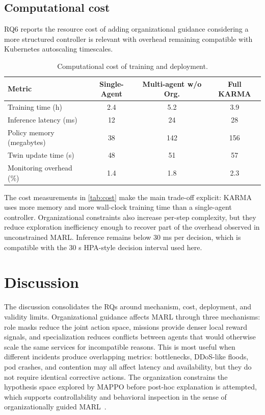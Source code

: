 \documentclass[journal]{IEEEtran}
\begin{document}
\subsection{Computational cost}

RQ6 reports the resource cost of adding organizational guidance considering a more structured controller is relevant with overhead remaining compatible with Kubernetes autoscaling timescales.
%
\begin{table}[t]
  \centering
  \caption{Computational cost of training and deployment.}
  \label{tab:cost}
  \scriptsize
  \setlength{\tabcolsep}{2.5pt}
  \begin{tabular}{lccc}
    \toprule
    \textbf{Metric}           & \textbf{Single-Agent} & \textbf{Multi-agent w/o Org.} & \textbf{Full KARMA} \\
    \midrule
    Training time (h)         & 2.4                   & 5.2                           & 3.9                 \\
    Inference latency (ms)    & 12                    & 24                            & 28                  \\
    Policy memory (megabytes) & 38                    & 142                           & 156                 \\
    Twin update time (s)      & 48                    & 51                            & 57                  \\
    Monitoring overhead (\%)  & 1.4                   & 1.8                           & 2.3                 \\
    \bottomrule
  \end{tabular}
\end{table}
%
The cost measurements in \autoref{tab:cost} make the main trade-off explicit: KARMA uses more memory and more wall-clock training time than a single-agent controller. Organizational constraints also increase per-step complexity, but they reduce exploration inefficiency enough to recover part of the overhead observed in unconstrained MARL. Inference remains below 30 ms per decision, which is compatible with the 30 s HPA-style decision interval used here.

\section{Discussion}
\label{sec:discussion}

The discussion consolidates the RQs around mechanism, cost, deployment, and validity limits. Organizational guidance affects MARL through three mechanisms: role masks reduce the joint action space, missions provide denser local reward signals, and specialization reduces conflicts between agents that would otherwise scale the same services for incompatible reasons. This is most useful when different incidents produce overlapping metrics: bottlenecks, DDoS-like floods, pod crashes, and contention may all affect latency and availability, but they do not require identical corrective actions. The organization constrains the hypothesis space explored by MAPPO before post-hoc explanation is attempted, which supports controllability and behavioral inspection in the sense of organizationally guided MARL~\cite{soule2025moisemarl}.
\end{document}
